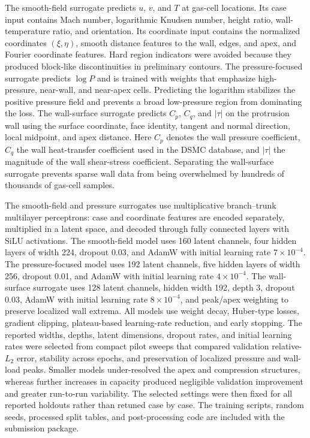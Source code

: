 \documentclass[aip,pof,preprint,floatfix,amsmath,amssymb]{revtex4-2}
\begin{document}
The smooth-field surrogate predicts $u$, $v$, and $T$ at gas-cell locations. Its case input contains Mach number, logarithmic Knudsen number, height ratio, wall-temperature ratio, and orientation. Its coordinate input contains the normalized coordinates $(\xi,\eta)$, smooth distance features to the wall, edges, and apex, and Fourier coordinate features. Hard region indicators were avoided because they produced block-like discontinuities in preliminary contours. The pressure-focused surrogate predicts $\log P$ and is trained with weights that emphasize high-pressure, near-wall, and near-apex cells. Predicting the logarithm stabilizes the positive pressure field and prevents a broad low-pressure region from dominating the loss. The wall-surface surrogate predicts $C_p$, $C_q$, and $|\tau|$ on the protrusion wall using the surface coordinate, face identity, tangent and normal direction, local midpoint, and apex distance. Here $C_p$ denotes the wall pressure coefficient, $C_q$ the wall heat-transfer coefficient used in the DSMC database, and $|\tau|$ the magnitude of the wall shear-stress coefficient. Separating the wall-surface surrogate prevents sparse wall data from being overwhelmed by hundreds of thousands of gas-cell samples.

The smooth-field and pressure surrogates use multiplicative branch--trunk multilayer perceptrons: case and coordinate features are encoded separately, multiplied in a latent space, and decoded through fully connected layers with SiLU activations. The smooth-field model uses 160 latent channels, four hidden layers of width 224, dropout 0.03, and AdamW with initial learning rate $7\times10^{-4}$. The pressure-focused model uses 192 latent channels, five hidden layers of width 256, dropout 0.01, and AdamW with initial learning rate $4\times10^{-4}$. The wall-surface surrogate uses 128 latent channels, hidden width 192, depth 3, dropout 0.03, AdamW with initial learning rate $8\times10^{-4}$, and peak/apex weighting to preserve localized wall extrema. All models use weight decay, Huber-type losses, gradient clipping, plateau-based learning-rate reduction, and early stopping. The reported widths, depths, latent dimensions, dropout rates, and initial learning rates were selected from compact pilot sweeps that compared validation relative-$L_2$ error, stability across epochs, and preservation of localized pressure and wall-load peaks. Smaller models under-resolved the apex and compression structures, whereas further increases in capacity produced negligible validation improvement and greater run-to-run variability. The selected settings were then fixed for all reported holdouts rather than retuned case by case. The training scripts, random seeds, processed split tables, and post-processing code are included with the submission package.
\end{document}
